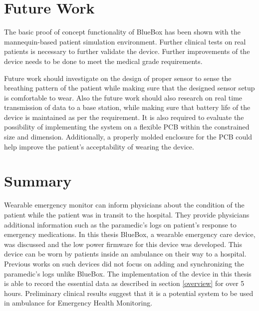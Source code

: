 \section{Future Work}
The basic proof of concept functionality of BlueBox has been shown with the mannequin-based patient simulation environment. Further clinical tests on real patients is necessary to further validate the device. Further improvements of the device needs to be done to meet the medical grade requirements.

Future work should investigate on the design of proper sensor to sense the breathing pattern of the patient while making sure that the designed sensor setup is comfortable to wear. Also the future work should also research on real time transmission of data to a base station, while making sure that battery life of the device is maintained as per the requirement. It is also required to evaluate the possibility of implementing the system on a flexible PCB within the constrained size and dimension. Additionally, a properly molded enclosure for the PCB could help improve the patient's acceptability of wearing the device. 
\section{Summary}
Wearable emergency monitor can inform physicians about the condition of the patient while the patient was in transit to the hospital. They provide physicians additional information such as the paramedic's logs on patient's response to emergency medications. In this thesis BlueBox, a wearable emergency care device, was discussed and the low power firmware for this device was developed. This device can be worn by patients inside an ambulance on their way to a hospital. Previous works on such devices did not focus on adding and synchronizing the paramedic's logs unlike BlueBox. The implementation of the device in this thesis is able to record the essential data as described in section \ref{overview} for over 5 hours. Preliminary clinical results suggest that it is a potential system to be used in ambulance for Emergency Health Monitoring.